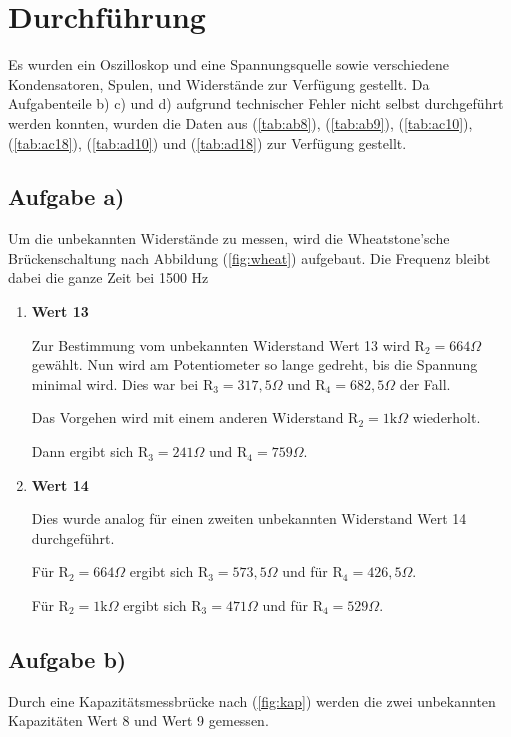 \newpage
\section{Durchführung}
Es wurden ein Oszilloskop und eine Spannungsquelle sowie verschiedene Kondensatoren, Spulen, und Widerstände zur Verfügung gestellt.
Da Aufgabenteile b) c) und d) aufgrund technischer Fehler nicht selbst durchgeführt werden konnten, wurden die Daten aus (\ref{tab:ab8}), (\ref{tab:ab9}), (\ref{tab:ac10}), (\ref{tab:ac18}), (\ref{tab:ad10}) und (\ref{tab:ad18}) zur Verfügung gestellt.

\subsection{Aufgabe a)}
Um die unbekannten Widerstände zu messen, wird die Wheatstone'sche Brückenschaltung nach Abbildung (\ref{fig:wheat}) aufgebaut.
Die Frequenz bleibt dabei die ganze Zeit bei 1500 Hz

\begin{enumerate}
\item \textbf{Wert 13}

Zur Bestimmung vom unbekannten Widerstand Wert 13 wird $\text{R}_2 = 664 \Omega$ gewählt.
Nun wird am Potentiometer so lange gedreht, bis die Spannung minimal wird.
Dies war bei $\text{R}_3 = 317,5 \Omega$ und $\text{R}_4 = 682,5 \Omega$ der Fall.

\noindent
Das Vorgehen wird mit einem anderen Widerstand $\text{R}_2 =1\text{k} \Omega$ wiederholt.

Dann ergibt sich $\text{R}_3 = 241 \Omega$ und $\text{R}_4 = 759 \Omega$.

\item \textbf{Wert 14}

Dies wurde analog für einen zweiten unbekannten Widerstand Wert 14 durchgeführt.

Für $\text{R}_2 = 664 \Omega$ ergibt sich $\text{R}_3 = 573,5 \Omega$ und für $\text{R}_4 = 426,5 \Omega$.

Für $\text{R}_2 = 1\text{k} \Omega$ ergibt sich $\text{R}_3 = 471 \Omega$ und für $\text{R}_4 = 529 \Omega$.
\end{enumerate}


\subsection{Aufgabe b)}

Durch eine Kapazitätsmessbrücke nach (\ref{fig:kap}) werden die zwei unbekannten Kapazitäten Wert 8 und Wert 9 gemessen.

